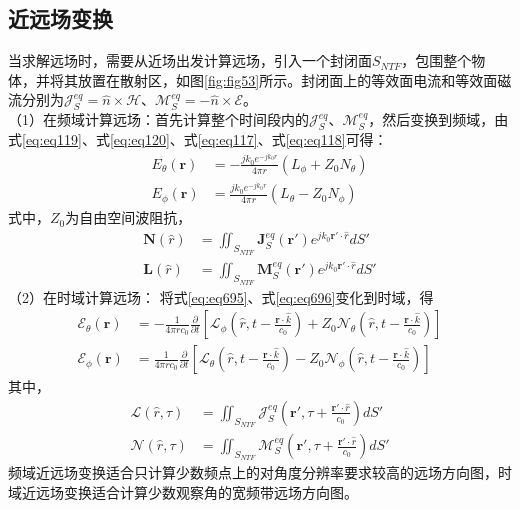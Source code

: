 \documentclass{article}
\numberwithin{equation}{section}
\renewcommand{\vec}[1]{\boldsymbol{#1}}
\begin{document}
\subsection{近远场变换}
当求解远场时，需要从近场出发计算远场，引入一个封闭面$S_{NTF}$，包围整个物体，并将其放置在散射区，如图\ref{fig:fig53}所示。封闭面上的等效面电流和等效面磁流分别为$\vec{\mathcal{J}}_S^{eq}=\hat{n}\times\vec{\mathcal{H}}$、$\vec{\mathcal{M}}_S^{eq}=-\hat{n}\times\vec{\mathcal{E}}$。\\
（1）在频域计算远场：首先计算整个时间段内的$\vec{\mathcal{J}}_S^{eq}$、$\vec{\mathcal{M}}_S^{eq}$，然后变换到频域，由式\ref{eq:eq119}、式\ref{eq:eq120}、式\ref{eq:eq117}、式\ref{eq:eq118}可得：
\begin{align}
    \label{eq:eq695}
    E_{\theta}(\vec{r})&=-\frac{jk_0e^{-jk_0r}}{4\pi r}(L_{\phi}+Z_0N_{\theta}) \\
    \label{eq:eq696}
    E_{\phi}(\vec{r})&=\frac{jk_0e^{-jk_0r}}{4\pi r}(L_{\theta}-Z_0N_{\phi})
\end{align}
式中，$Z_0$为自由空间波阻抗，
\begin{align}
    \label{eq:eq697}
    \mathbf{N}(\hat{r})&=\iint_{S_{NTF}}\mathbf{J}_S^{eq}(\vec{r}')e^{jk_0\vec{r}'\cdot\hat{r}}dS' \\
    \mathbf{L}(\hat{r})&=\iint_{S_{NTF}}\mathbf{M}_S^{eq}(\vec{r}')e^{jk_0\vec{r}'\cdot\hat{r}}dS'
\end{align}
（2）在时域计算远场：
将式\ref{eq:eq695}、式\ref{eq:eq696}变化到时域，得
\begin{align}
    \label{eq:eq698}
    \mathcal{E}_{\theta}(\vec{r})&=-\frac{1}{4\pi rc_0}\frac{\partial}{\partial t}\left[\mathcal{L}_{\phi}\left(\hat{r},t-\frac{\vec{r}\cdot\hat{k}}{c_0}\right)+Z_0\mathcal{N}_{\theta}\left(\hat{r},t-\frac{\vec{r}\cdot\hat{k}}{c_0}\right)\right] \\
    \label{eq:eq699}
    \mathcal{E}_{\phi}(\vec{r})&=\frac{1}{4\pi rc_0}\frac{\partial}{\partial t}\left[\mathcal{L}_{\theta}\left(\hat{r},t-\frac{\vec{r}\cdot\hat{k}}{c_0}\right)-Z_0\mathcal{N}_{\phi}\left(\hat{r},t-\frac{\vec{r}\cdot\hat{k}}{c_0}\right)\right]
\end{align}
其中，
\begin{align}
    \vec{\mathcal{L}}(\hat{r},\tau)&=\iint_{S_{NTF}}\vec{\mathcal{J}}_S^{eq}\left(\vec{r}',\tau+\frac{\vec{r}'\cdot\hat{r}}{c_0}\right)dS' \\
    \vec{\mathcal{N}}(\hat{r},\tau)&=\iint_{S_{NTF}}\vec{\mathcal{M}}_S^{eq}\left(\vec{r}',\tau+\frac{\vec{r}'\cdot\hat{r}}{c_0}\right)dS'
\end{align}
频域近远场变换适合只计算少数频点上的对角度分辨率要求较高的远场方向图，时域近远场变换适合计算少数观察角的宽频带远场方向图。
\end{document}
